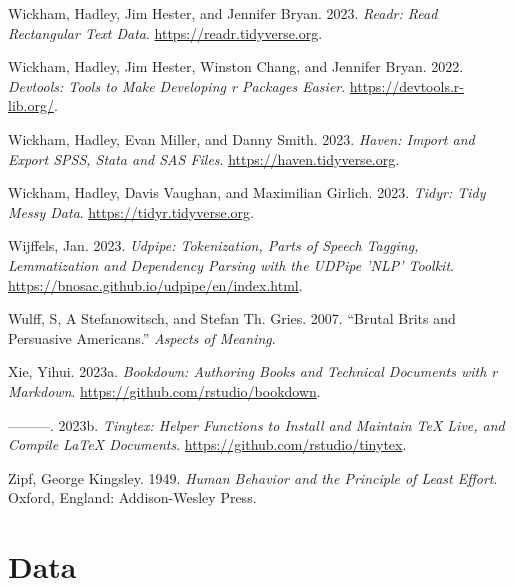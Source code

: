 \documentclass[
  letterpaper,
  DIV=11,
  numbers=noendperiod]{scrreport}
\newlength{\cslhangindent}
\newlength{\cslentryspacingunit} %
\newenvironment{CSLReferences}[2] %
 {%
  \setlength{\parindent}{0pt}
  \ifodd #1
  \let\oldpar\par
  \def\par{\hangindent=\cslhangindent\oldpar}
  \fi
  \setlength{\parskip}{#2\cslentryspacingunit}
 }%
 {}
\theoremstyle{definition}
\theoremstyle{remark}
\begin{document}
\begin{CSLReferences}{1}{0}
\leavevmode{}%
Wickham, Hadley, Jim Hester, and Jennifer Bryan. 2023. \emph{Readr: Read
Rectangular Text Data}. \url{https://readr.tidyverse.org}.

\leavevmode{}%
Wickham, Hadley, Jim Hester, Winston Chang, and Jennifer Bryan. 2022.
\emph{Devtools: Tools to Make Developing r Packages Easier}.
\url{https://devtools.r-lib.org/}.

\leavevmode{}%
Wickham, Hadley, Evan Miller, and Danny Smith. 2023. \emph{Haven: Import
and Export SPSS, Stata and SAS Files}.
\url{https://haven.tidyverse.org}.

\leavevmode{}%
Wickham, Hadley, Davis Vaughan, and Maximilian Girlich. 2023.
\emph{Tidyr: Tidy Messy Data}. \url{https://tidyr.tidyverse.org}.

\leavevmode{}%
Wijffels, Jan. 2023. \emph{Udpipe: Tokenization, Parts of Speech
Tagging, Lemmatization and Dependency Parsing with the UDPipe 'NLP'
Toolkit}. \url{https://bnosac.github.io/udpipe/en/index.html}.

\leavevmode{}%
Wulff, S, A Stefanowitsch, and Stefan Th. Gries. 2007. {``Brutal Brits
and Persuasive Americans.''} \emph{Aspects of Meaning}.

\leavevmode{}%
Xie, Yihui. 2023a. \emph{Bookdown: Authoring Books and Technical
Documents with r Markdown}. \url{https://github.com/rstudio/bookdown}.

\leavevmode{}%
---------. 2023b. \emph{Tinytex: Helper Functions to Install and
Maintain TeX Live, and Compile LaTeX Documents}.
\url{https://github.com/rstudio/tinytex}.

\leavevmode{}%
Zipf, George Kingsley. 1949. \emph{Human Behavior and the Principle of
Least Effort}. Oxford, England: Addison-Wesley Press.

\end{CSLReferences}

\cleardoublepage
{}
{}
\appendix

\hypertarget{data-appendix}{%
\chapter{Data}\label{data-appendix}}
\end{document}
